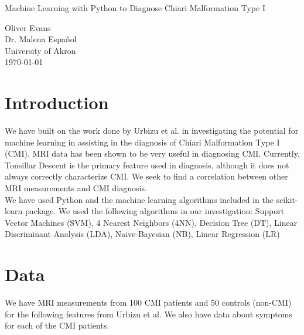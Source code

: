 \documentclass[10pt]{article}
\begin{document}
\null

\thispagestyle{empty}
\addtocounter{page}{-1}

\begin{center}
  \begin{sffamily}
	\begin{bfseries}
	  \null
	  \vfill
	  \Huge{Machine Learning with Python to Diagnose Chiari Malformation Type I} \\
	  \vspace{20pt}
	\end{bfseries}
  \end{sffamily}
  \begin{Large}
	Oliver Evans \\
	Dr. Malena Espa\~nol \\
	University of Akron \\
	\vspace{20pt}
	\today
  \end{Large}
  \vspace{30pt}

  \null
  \vfill
  \vfill
  \null
\end{center}
\pagebreak

\section{Introduction}
We have built on the work done by Urbizu et al. \cite{urbizu} in investigating the potential for machine learning in assisting in the diagnosis of Chiari Malformation Type I (CMI). MRI data has been shown to be very useful in diagnosing CMI. Currently, Tonsillar Descent is the primary feature used in diagnosis, although it does not always correctly characterize CMI. We seek to find a correlation between other MRI measurements and CMI diagnosis. \\

We have used Python and the machine learning algorithms included in the scikit-learn\cite{scikit-learn} package. We used the following algorithms in our investigation: Support Vector Machines (SVM), 4 Nearest Neighbors (4NN), Decision Tree (DT), Linear Discriminant Analysis (LDA), Naive-Bayesian (NB), Linear Regression (LR)

\section{Data}
We have MRI measurements from 100 CMI patients and 50 controls (non-CMI) for the following features from Urbizu et al. We also have data about symptoms for each of the CMI patients. \\
\end{document}
